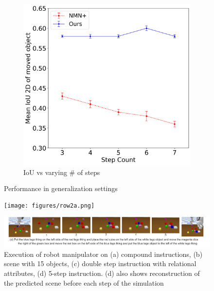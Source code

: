 \begin{figure}[h!]
\begin{subfigure}{0.5\hsize}
    \includegraphics[scale=0.19]{figures/multi-step-1.png}
    \caption{\footnotesize{IoU vs varying \# of steps}}
    \label{fig:large_steps}
\end{subfigure}
\caption{\footnotesize{Performance in generalization settings}}
\vspace{-0.15 in}
\end{figure}


\begin{figure}[hbt!]
    \centering    
    \texttt{[image: figures/row2a.png]}
    \label{fig:qual-1}
\end{figure}
\begin{figure}[hbt!]
    \centering    
    \includegraphics[width=17cm]{figures/row2b.png}
    \caption{
    \footnotesize{
    Execution of robot manipulator on (a) compound instructions, (b) scene with 15 objects, (c) double step instruction with relational attributes, (d) 5-step instruction. (d) also shows reconstruction of the predicted scene before each step of the simulation
    }}
    \label{fig:qual-1}
    \vspace{-0.1 in}
\end{figure}


